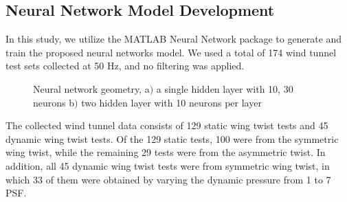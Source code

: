 \documentclass[11pt]{ucthesis}
\begin{document}
\subsection{Neural Network Model Development}
\label{sec:NN}

In this study, we utilize the MATLAB Neural Network package to generate and train the proposed neural networks model. We used a total of 174 wind tunnel test sets collected at 50 Hz, and no filtering was applied. 

\begin{figure}[h!]
\centering
{} 
\caption{Neural network geometry, a$)$ a single hidden layer with 10, 30 neurons b$)$ two hidden layer with 10 neurons per layer}
\label{fig:NNconfig}
\end{figure}

The collected wind tunnel data consists of 129 static wing twist tests and 45 dynamic wing twist tests. Of the 129 static tests, 100 were from the symmetric wing twist, while the remaining 29 tests were from the asymmetric twist. In addition, all 45 dynamic wing twist tests were from symmetric wing twist, in which 33 of them were obtained by varying the dynamic pressure from 1 to 7 PSF. 
\end{document}
